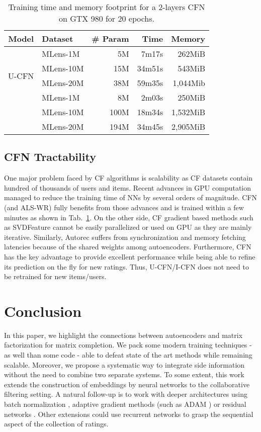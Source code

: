 \documentclass{article}
\begin{document}
\begin{table}[h]
\centering 	    
\begin{tabular}{clrrr}
\hline
Model & Dataset & \# Param & Time & Memory  \\
\hline
\multirow{4}{*}{U-CFN} 
 & MLens-1M    &  5M  &  7m17s  &  262MiB  \\
 & MLens-10M   & 15M  & 34m51s  &  543MiB  \\
 & MLens-20M   & 38M  & 59m35s  & 1,044Mib  \\
\hline	
\multirow{4}{*}{I-CFN} 
 & MLens-1M   &   8M &  2m03s  &  250MiB  \\
 & MLens-10M   & 100M & 18m34s  & 1,532MiB  \\
 & MLens-20M   & 194M & 34m45s  & 2,905MiB  \\
\hline	
\end{tabular}
\caption{Training time and memory footprint for a 2-layers CFN on GTX 980 for 20 epochs.}
\label{tab:Time}
\end{table}


\subsection{CFN Tractability}
One major problem faced by CF algorithms is scalability as CF datasets contain hundred of thousands of users and items.
Recent advances in GPU computation managed to reduce the training time of NNs by several orders of magnitude. CFN (and ALS-WR) fully benefits from those advances and is trained within a few minutes as shown in Tab.~\ref{tab:Time}.  On the other side, CF gradient based methods such as SVDFeature \cite{Chen2012} cannot be easily parallelized or used on GPU as they are mainly iterative. Similarly, Autorec \cite{Sedhain2015}  suffers from  synchronization and memory fetching latencies because of the shared weights among autoencoders. 
Furthermore, CFN has the key advantage to provide excellent performance while being able to refine its prediction on the fly for new ratings. Thus, U-CFN/I-CFN does not need to be retrained for new items/users. 

\section{Conclusion} 
In this paper, we highlight the connections between autoencoders and matrix factorization for matrix completion. We pack some modern training techniques - as well than some code - able to defeat state of the art methods while remaining scalable.   
Moreover, we propose a systematic way to integrate side information without the need to combine two separate systems. To some extent, this work extends the construction of embeddings by neural networks to the collaborative filtering setting. A natural follow-up is to work with deeper architectures using batch normalization \cite{Ioffe2015}, adaptive gradient methods (such as ADAM \cite{Kingma2014})
or residual networks \cite{He2015}. Other extensions could use recurrent networks to grasp the sequential aspect of the collection of ratings.
\end{document}
